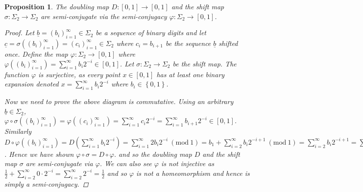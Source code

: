 \documentclass[11pt,a4paper,oneside]{memoir}
\theoremstyle{plain}
\newtheorem{prop}[thm]{Proposition}
\theoremstyle{definition}
\newcommand{\mmod}[1]{\ (\mathrm{mod}\ #1)}
\begin{document}
\begin{prop} \label{prop:doubling-shift}
    The doubling map $D: [0, 1] \to [0, 1]$ and the shift map $\sigma: \Sigma_2 \to \Sigma_2$ are semi-conjugate via the semi-conjugacy $\varphi: \Sigma_2 \to [0, 1]$.
    \begin{proof}
        Let $\underline{b} = (b_i)_{i=1}^{\infty} \in \Sigma_2$ be a sequence of binary digits and let $\underline{c} = \sigma\left((b_i)_{i=1}^{\infty}\right) = (c_i)_{i=1}^{\infty} \in \Sigma_2$ where $c_i = b_{i + 1}$ be the sequence $\underline{b}$ shifted once. Define the map $\varphi: \Sigma_2 \to [0, 1]$ where $\varphi\left((b_i)_{i=1}^{\infty}\right) = \sum_{i=1}^{\infty} b_i2^{-i} \in [0, 1]$. Let $\sigma: \Sigma_2 \to \Sigma_2$ be the shift map. The function $\varphi$ is surjective, as every point $x \in [0, 1]$ has at least one binary expansion denoted $x=\sum_{i=1}^{\infty}b_i2^{-i}$ where $b_i \in \left\lbrace 0, 1 \right\rbrace$.
        \begin{center}
        \end{center}
        Now we need to prove the above diagram is commutative. Using an arbitrary $\underline{b} \in \Sigma_2$, $\varphi \circ \sigma\left((b_i)_{i=1}^{\infty}\right) = \varphi\left((c_i)_{i=1}^{\infty}\right) = \sum_{i=1}^{\infty} c_i2^{-i} = \sum_{i=1}^{\infty} b_{i+1}2^{-i} \in [0, 1]$. Similarly $D \circ \varphi\left((b_i)_{i=1}^{\infty}\right) = D\left(\sum_{i=1}^{\infty} b_i2^{-i}\right) = \sum_{i=1}^{\infty} 2b_i2^{-i} \mmod 1 = b_1 + \sum_{i=2}^{\infty} b_i2^{-i+1} \mmod 1 = \sum_{i=2}^{\infty} b_i2^{-i+1} = \sum_{j=1}^{\infty} b_{j+1}2^{-j} \in [0, 1]$. Hence we have shown $\varphi \circ \sigma = D \circ \varphi$. and so the doubling map $D$ and the shift map $\sigma$ are semi-conjugate via $\varphi$. We can also see $\varphi$ is not injective as $\frac{1}{2} + \sum_{i=2}^{\infty}0 \cdot 2^{-i} = \sum_{i=2}^{\infty}2^{-i} = \frac{1}{2}$ and so $\varphi$ is not a homeomorphism and hence is simply a semi-conjugacy. 
    \end{proof}
\end{prop}
\end{document}
